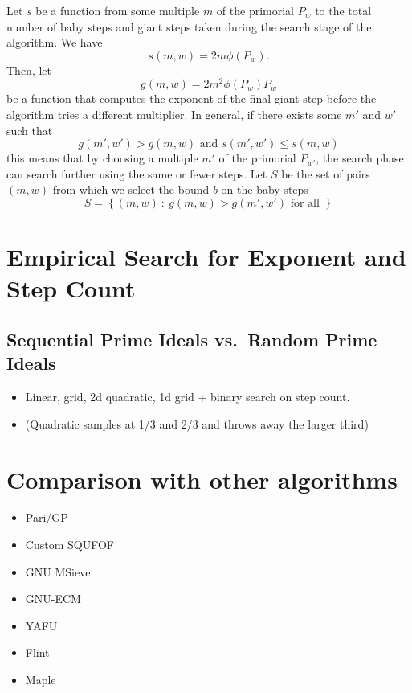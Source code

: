 \documentclass{ucalgthes1}
\theoremstyle{definition}
\begin{document}
Let $s$ be a function from some multiple $m$ of the primorial $P_w$ to the total number of baby steps and giant steps taken during the search stage of the algorithm.  We have
\[
	s(m, w) = 2 m \phi(P_w).
\]
Then, let
\[
	g(m, w) = 2 m^2 \phi(P_w) P_w
\]
be a function that computes the exponent of the final giant step before the algorithm tries a different multiplier.  In general, if there exists some $m'$ and $w'$ such that 
\[
g(m', w') > g(m, w) \textrm{ and } s(m', w') \le s(m, w)
\]
this means that by choosing a multiple $m'$ of the primorial $P_{w'}$, the search phase can search further using the same or fewer steps.  Let $S$ be the set of pairs $(m, w)$ from which we select the bound $b$ on the baby steps
\[
  S = \left\{ (m, w) ~:~ g(m, w) > g(m', w') \textrm{ for all }  \right\}
\]

\section{Empirical Search for Exponent and Step Count}
\label{sec:ssparEmpirical}


\subsection{Sequential Prime Ideals vs.\ Random Prime Ideals}

\begin{itemize}
\item Linear, grid, 2d quadratic, 1d grid + binary search on step count.
\item (Quadratic samples at 1/3 and 2/3 and throws away the larger third)
\end{itemize}

\section{Comparison with other algorithms}
\begin{itemize}
\item Pari/GP
\item Custom SQUFOF
\item GNU MSieve
\item GNU-ECM
\item YAFU
\item Flint
\item Maple
\end{itemize}
\end{document}
